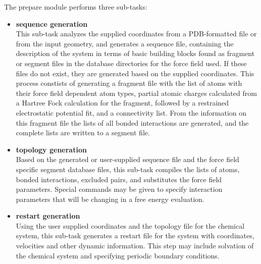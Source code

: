The prepare module performs three sub-tasks:
\begin{itemize}
\item[{\bf *}]
{\bf sequence generation}\\
This sub-task analyzes the supplied coordinates from a PDB-formatted file
or from the input geometry, and generates a sequence file, containing the
description of the system in terms of basic building blocks found as
fragment or segment files in the database directories for the force field 
used. If these files do not exist, they are generated based on the supplied
coordinates. This process constists of generating a fragment file with the
list of atoms with their force field dependent atom types, partial atomic
charges calculated from a Hartree Fock calculation for the fragment, followed
by a restrained electrostatic potential fit, and a connectivity list. From
the information on this fragment file the lists of all bonded interactions
are generated, and the complete lists are written to a segment file.
\item[{\bf *}]
{\bf topology generation}\\
Based on the generated or user-supplied sequence file and the force field
specific segment database files, this sub-task compiles the lists of atoms,
bonded interactions, excluded pairs, and substitutes the force field
parameters. Special commands may be given to specify interaction parameters
that will be changing in a free energy evaluation.
\item[{\bf *}]
{\bf restart generation}\\
Using the user supplied coordinates and the topology file for the chemical
system, this sub-task generates a restart file for the system with coordinates,
velocities and other dynamic information. This step may include solvation
of the chemical system and specifying periodic boundary conditions.
\end{itemize}

